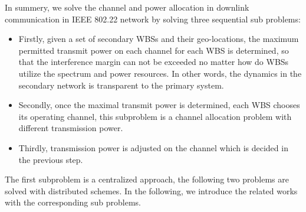 In summery, we solve the channel and power allocation in downlink communication in IEEE 802.22 network by solving three sequential sub problems:
\begin{itemize}
\item  Firstly, given a set of secondary WBSs and their geo-locations, the maximum permitted transmit power on each channel for each WBS is determined, so that the interference margin can not be exceeded no matter how do WBSs utilize the spectrum and power resources. 
In other words, the dynamics in the secondary network is transparent to the primary system. 
\item Secondly, once the maximal transmit power is determined, each WBS chooses its operating channel, this subproblem is a channel allocation problem with different transmission power. 
\item Thirdly, transmission power is adjusted on the channel which is decided in the previous step.
\end{itemize}
The first subproblem is a centralized approach, the following two problems are solved with distributed schemes.
In the following, we introduce the related works with the corresponding sub problems.





